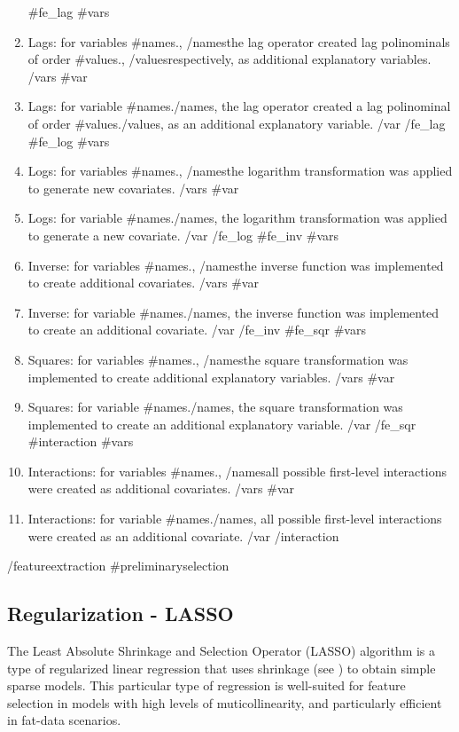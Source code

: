 \documentclass{article}
\begin{document}
\begin{enumerate}
  {{#fe_lag}}
    {{#vars}}
    \item Lags: for variables {{#names}}{{.}}, {{/names}}the lag operator created lag polinominals of order {{#values}}{{.}}, {{/values}}respectively, as additional explanatory variables.
    {{/vars}}
    {{#var}}
    \item Lags: for variable {{#names}}{{.}}{{/names}}, the lag operator created a lag polinominal of order {{#values}}{{.}}{{/values}}, as an additional explanatory variable.
    {{/var}}
  {{/fe_lag}}
  {{#fe_log}}
    {{#vars}}
    \item Logs: for variables {{#names}}{{.}}, {{/names}}the logarithm transformation was applied to generate new covariates.
    {{/vars}}
    {{#var}}
    \item Logs: for variable {{#names}}{{.}}{{/names}}, the logarithm transformation was applied to generate a new covariate.
    {{/var}}
  {{/fe_log}}
  {{#fe_inv}}
    {{#vars}}
    \item Inverse: for variables {{#names}}{{.}}, {{/names}}the inverse function was implemented to create additional covariates.
    {{/vars}}
    {{#var}}
    \item Inverse: for variable {{#names}}{{.}}{{/names}}, the inverse function was implemented to create an additional covariate.
    {{/var}}
  {{/fe_inv}}
  {{#fe_sqr}}
    {{#vars}}
    \item Squares: for variables {{#names}}{{.}}, {{/names}}the square transformation was implemented to create additional explanatory variables.
    {{/vars}}
    {{#var}}
    \item Squares: for variable {{#names}}{{.}}{{/names}}, the square transformation was implemented to create an additional explanatory variable.
    {{/var}}
  {{/fe_sqr}} 
  {{#interaction}}
    {{#vars}}
    \item Interactions: for variables {{#names}}{{.}}, {{/names}}all possible first-level interactions were created as additional covariates.
    {{/vars}}
    {{#var}}
    \item Interactions: for variable {{#names}}{{.}}{{/names}}, all possible first-level interactions were created as an additional covariate.
    {{/var}}
  {{/interaction}}
\end{enumerate}
{{/featureextraction}}
{{#preliminaryselection}}
\subsection{Regularization - LASSO}
The Least Absolute Shrinkage and Selection Operator (LASSO) algorithm is a type of regularized linear regression that uses shrinkage (see \cite{tibshirani1996}) to obtain simple sparse models. This particular type of regression is well-suited for feature selection in models with high levels of muticollinearity, and particularly efficient in fat-data scenarios.
\end{document}
